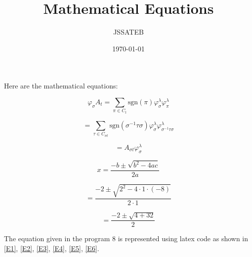 \documentclass{article}
\title{Mathematical Equations}
\author{JSSATEB}
\date{\today}
\begin{document}
	\maketitle

	Here are the mathematical equations:

	\begin{equation}
		\label{E1}
		\varphi_{\sigma}A_t = \sum_{\pi \in C_t} \text{sgn}(\pi) \varphi_{\sigma}^{\lambda} \varphi_{\pi}^{\lambda}
	\end{equation}

	\begin{equation}
		\label{E2}
			= \sum_{\tau \in C_{\sigma t}} \text{sgn}(\sigma^{-1} \tau \sigma) \varphi_{\sigma}^{\lambda} \varphi_{\sigma^{-1} \tau \sigma}^{\lambda}
	\end{equation}

	\begin{equation}
		\label{E3}
		= A_{\sigma t} \varphi_{\sigma}^{\lambda}
	\end{equation}

	\begin{equation}
		\label{E4}
		x = \frac{-b \pm \sqrt{b^2 - 4ac}}{2a}
	\end{equation}

	\begin{equation}
		\label{E5}
		= \frac{-2 \pm \sqrt{2^2 - 4 \cdot 1 \cdot (-8)}}{2 \cdot 1}
	\end{equation}

	\begin{equation}
			\label{E6}
			= \frac{-2 \pm \sqrt{4 + 32}}{2}
	\end{equation}

	The equation given in the program 8 is represented using latex code as shown in \ref{E1}, \ref{E2}, \ref{E3}, \ref{E4}, \ref{E5}, \ref{E6}. 
\end{document}
